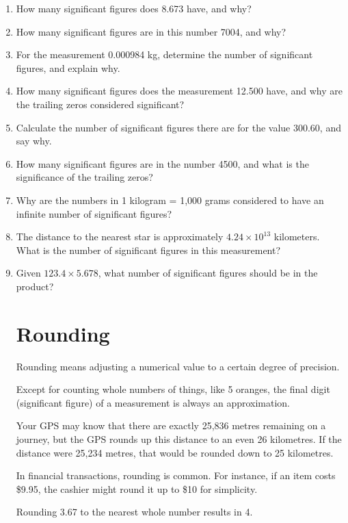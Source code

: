 \documentclass{article}
\begin{document}
\begin{enumerate}
\begin{itemize}
\end{itemize}

\item How many significant figures does 8.673 have, and why?
\item How many significant figures are in this number 7004, and why?
\item For the measurement 0.000984 kg, determine the number of significant figures, and explain why.
\item How many significant figures does the measurement 12.500 have, and why are the trailing zeros considered significant?
\item Calculate the number of significant figures there are for the value 300.60, and say why.
\item How many significant figures are in the number 4500, and what is the significance of the trailing zeros?
\item Why are the numbers in 1 kilogram = 1,000 grams considered to have an infinite number of significant figures?
\item The distance to the nearest star is approximately \(4.24 \times 10^{13}\) kilometers. What is the number of significant figures in this measurement?
\item Given $123.4 \times 5.678$, what number of significant figures should be in the product?

\section*{Rounding}

Rounding means adjusting a numerical value to a certain degree of precision.

Except for counting whole numbers of things, like 5 oranges, the final digit (significant figure) of a measurement is always an approximation. 

Your GPS may know that there are exactly 25,836 metres remaining on a journey, but the GPS rounds up this distance to an even 26 kilometres. If the distance were 25,234 metres, that would be rounded down to 25 kilometres.

In financial transactions, rounding is common. For instance, if an item costs \$9.95, the cashier might round it up to \$10 for simplicity.

Rounding 3.67 to the nearest whole number results in 4.


\end{enumerate}
\end{document}
